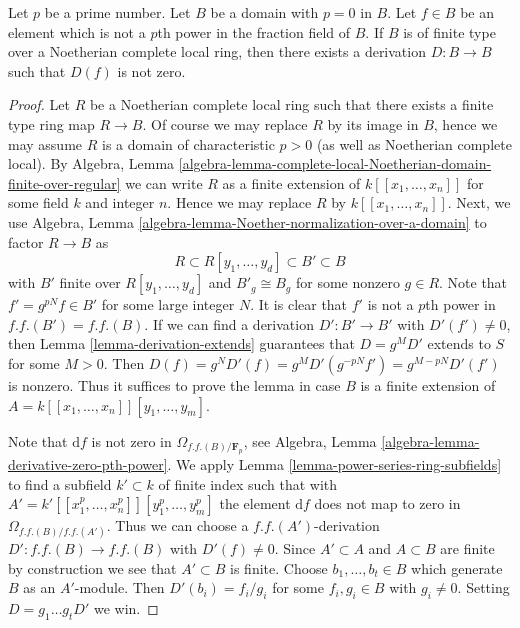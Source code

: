\begin{lemma}
\label{lemma-find-D}
Let $p$ be a prime number. Let $B$ be a domain with $p = 0$ in $B$.
Let $f \in B$ be an element which is not a $p$th power in the fraction
field of $B$. If $B$ is of finite type over a Noetherian complete
local ring, then there exists a derivation $D : B \to B$ such that $D(f)$
is not zero.
\end{lemma}

\begin{proof}
Let $R$ be a Noetherian complete local ring such that there exists
a finite type ring map $R \to B$. Of course we may replace $R$ by
its image in $B$, hence we may assume $R$ is a domain of characteristic
$p > 0$ (as well as Noetherian complete local). By Algebra, Lemma
\ref{algebra-lemma-complete-local-Noetherian-domain-finite-over-regular}
we can write $R$ as a finite extension of $k[[x_1, \ldots, x_n]]$ for some
field $k$ and integer $n$. Hence we may replace $R$ by $k[[x_1, \ldots, x_n]]$.
Next, we use
Algebra, Lemma \ref{algebra-lemma-Noether-normalization-over-a-domain}
to factor $R \to B$ as
$$
R \subset R[y_1, \ldots, y_d] \subset B' \subset B
$$
with $B'$ finite over $R[y_1, \ldots, y_d]$ and $B'_g \cong B_g$
for some nonzero $g \in R$. Note that $f' = g^{pN} f \in B'$ for some
large integer $N$. It is clear that $f'$ is not a $p$th power in
$f.f.(B') = f.f.(B)$. If we can find a derivation
$D' : B' \to B'$ with $D'(f') \not = 0$, then
Lemma \ref{lemma-derivation-extends}
guarantees that $D = g^MD'$ extends to $S$ for some $M > 0$. Then
$D(f) = g^ND'(f) = g^MD'(g^{-pN}f') = g^{M - pN}D'(f')$ is nonzero.
Thus it suffices to prove the lemma in case
$B$ is a finite extension of $A = k[[x_1, \ldots, x_n]][y_1, \ldots, y_m]$.

\medskip\noindent
Note that $\text{d}f$ is not zero in $\Omega_{f.f.(B)/\mathbf{F}_p}$, see
Algebra, Lemma \ref{algebra-lemma-derivative-zero-pth-power}.
We apply Lemma \ref{lemma-power-series-ring-subfields} to find a subfield
$k' \subset k$ of finite index such that with
$A' = k'[[x_1^p, \ldots, x_n^p]][y_1^p, \ldots, y_m^p]$ the element
$\text{d}f$ does not map to zero in $\Omega_{f.f.(B)/f.f.(A')}$.
Thus we can choose a $f.f.(A')$-derivation $D' : f.f.(B) \to f.f.(B)$
with $D'(f) \not = 0$. Since $A' \subset A$ and $A \subset B$ are
finite by construction we see that $A' \subset B$ is finite.
Choose $b_1, \ldots, b_t \in B$ which generate $B$ as an $A'$-module.
Then $D'(b_i) = f_i/g_i$ for some $f_i, g_i \in B$ with $g_i \not = 0$.
Setting $D = g_1 \ldots g_t D'$ we win.
\end{proof}

